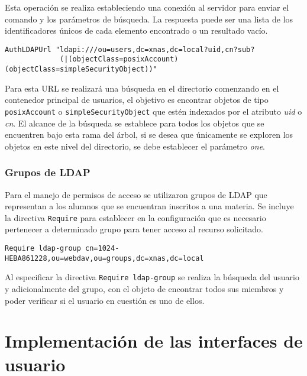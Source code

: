Esta operaci\'{o}n se realiza estableciendo una conexi\'{o}n al servidor para enviar el comando y los par\'{a}metros de b\'{u}squeda. La respuesta puede ser una lista de los identificadores \'{u}nicos de cada elemento encontrado o un resultado vac\'{i}o.

{
\footnotesize
\linespread{1}
\begin{verbatim}
AuthLDAPUrl "ldapi:///ou=users,dc=xnas,dc=local?uid,cn?sub?
             (|(objectClass=posixAccount)(objectClass=simpleSecurityObject))"
\end{verbatim}
}


Para esta \textsc{\gls{URL}} se realizar\'{a} una b\'{u}squeda en el directorio comenzando en el contenedor principal de usuarios, el objetivo es encontrar objetos de tipo \texttt{posixAccount} o \texttt{simpleSecurityObject} que est\'{e}n indexados por el atributo \textsl{uid} o \textsl{cn}. El alcance de la b\'{u}squeda se establece para todos los objetos que se encuentren bajo esta rama del \'{a}rbol, si se desea que \'{u}nicamente se exploren los objetos en este nivel del directorio, se debe establecer el par\'{a}metro \textsl{one}.

        \subsubsection {Grupos de \textsc{LDAP}}

Para el manejo de permisos de acceso se utilizaron grupos de \textsc{\gls{LDAP}} que representan a los alumnos que se encuentran inscritos a una materia. Se incluye la directiva \texttt{Require} para establecer en la configuraci\'{o}n que es necesario pertenecer a determinado grupo para tener acceso al recurso solicitado.

{
\footnotesize
\linespread{1}
\begin{verbatim}
Require ldap-group cn=1024-HEBA861228,ou=webdav,ou=groups,dc=xnas,dc=local
\end{verbatim}
}

Al especificar la directiva \texttt{Require ldap-group} se realiza la b\'{u}squeda del usuario y adicionalmente del grupo, con el objeto de encontrar todos sus miembros y poder verificar si el usuario en cuesti\'{o}n es uno de ellos.


    \section {Implementaci\'{o}n de las interfaces de usuario}


